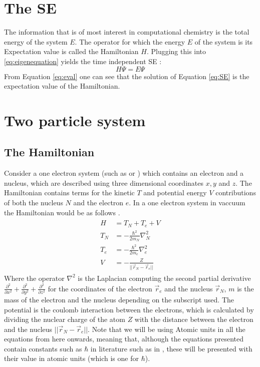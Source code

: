 \documentclass[../master_thesis.tex]{subfiles}
\begin{document}
\section{The \ac{SE}}
The information that is of most interest in computational chemistry is the
total energy of the system $ E $. The operator for which the energy $E$ of the
system is its Expectation value is called the Hamiltonian $H$. Plugging this
into \ref{eq:eigenequation} yields the time independent \ac{SE}
\cite{Cramer:2004, Jensen:2017}:
\begin{equation}
  H\Psi = E\Psi\label{eq:SE}
\end{equation}
From Equation \ref{eq:eval} one can see that the solution of Equation
\ref{eq:SE} is the expectation value of the Hamiltonian.



\section{Two particle system}
\subsection{The Hamiltonian}
Consider a one electron system (such as  or ) which contains an
electron and a nucleus, which are described using three dimensional coordinates
$ x, y $ and $ z $. The Hamiltonian contains terms for the kinetic $T$ and
potential energy $V$ contributions of both the nucleus $ N $ and the electron
$ e $. In a one electron system in vaccuum the Hamiltonian would be as follows
\cite{Jensen:2017, Cramer:2004}.
\begin{align}
  \begin{split}
    H   &= T_N + T_e + V \\
    T_N &= -\frac{\hbar^2}{2m_N}\nabla^2_N \\
    T_e &= -\frac{\hbar^2}{2m_e}\nabla^2_e \\
    V   &= -\frac{Z}{||\vec{r}_N - \vec{r}_e||} \label{eq:twopH}
  \end{split}
\end{align}
Where the operator $ \nabla^2$ is the Laplacian computing the second partial
derivative $ \frac{\partial^2}{\partial x^2} + \frac{\partial^2}{\partial y^2} +
\frac{\partial^2}{\partial z^2} $ for the coordinates of the electron $\vec{r}_e$
and the nucleus $\vec{r}_N$, $ m $ is the mass of the electron and the nucleus
depending on the subscript used. The potential is the coulomb interaction
between the electrons, which is calculated by dividing the nuclear charge of the
atom $ Z $ with the distance between the electron and the nucleus
$ ||\vec{r}_N - \vec{r}_e|| $. Note that we will be using Atomic units in all
the equations from here onwards, meaning that, although the equations presented
contain constants such as $\hbar$ in literature such as in \cite{Atkins:2014},
these will be presented with their value in atomic units (which is one for
$\hbar$).
\end{document}
